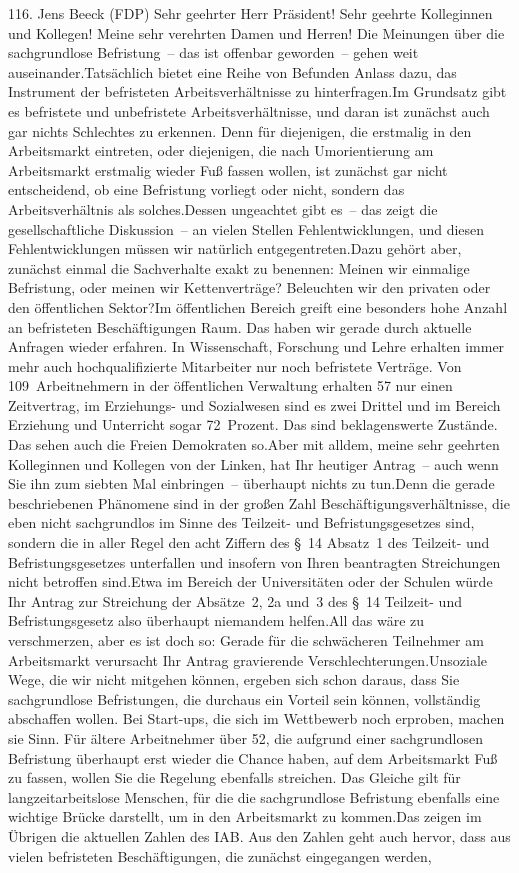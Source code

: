 \documentclass{article}
\begin{document}
	116. Jens Beeck (FDP) Sehr geehrter Herr Präsident! Sehr geehrte Kolleginnen und Kollegen! Meine sehr verehrten Damen und Herren! Die Meinungen über die sachgrundlose Befristung – das ist offenbar geworden – gehen weit auseinander.Tatsächlich bietet eine Reihe von Befunden Anlass dazu, das Instrument der befristeten Arbeitsverhältnisse zu hinterfragen.Im Grundsatz gibt es befristete und unbefristete Arbeitsverhältnisse, und daran ist zunächst auch gar nichts Schlechtes zu erkennen. Denn für diejenigen, die erstmalig in den Arbeitsmarkt eintreten, oder diejenigen, die nach Umorientierung am Arbeitsmarkt erstmalig wieder Fuß fassen wollen, ist zunächst gar nicht entscheidend, ob eine Befristung vorliegt oder nicht, sondern das Arbeitsverhältnis als solches.Dessen ungeachtet gibt es – das zeigt die gesellschaftliche Diskussion – an vielen Stellen Fehlentwicklungen, und diesen Fehlentwicklungen müssen wir natürlich entgegentreten.Dazu gehört aber, zunächst einmal die Sachverhalte exakt zu benennen: Meinen wir einmalige Befristung, oder meinen wir Kettenverträge? Beleuchten wir den privaten oder den öffentlichen Sektor?Im öffentlichen Bereich greift eine besonders hohe Anzahl an befristeten Beschäftigungen Raum. Das haben wir gerade durch aktuelle Anfragen wieder erfahren. In Wissenschaft, Forschung und Lehre erhalten immer mehr auch hochqualifizierte Mitarbeiter nur noch befristete Verträge. Von 109 Arbeitnehmern in der öffentlichen Verwaltung erhalten 57 nur einen Zeitvertrag, im Erziehungs- und Sozialwesen sind es zwei Drittel und im Bereich Erziehung und Unterricht sogar 72 Prozent. Das sind beklagenswerte Zustände. Das sehen auch die Freien Demokraten so.Aber mit alldem, meine sehr geehrten Kolleginnen und Kollegen von der Linken, hat Ihr heutiger Antrag – auch wenn Sie ihn zum siebten Mal einbringen – überhaupt nichts zu tun.Denn die gerade beschriebenen Phänomene sind in der großen Zahl Beschäftigungsverhältnisse, die eben nicht sachgrundlos im Sinne des Teilzeit- und Befristungsgesetzes sind, sondern die in aller Regel den acht Ziffern des § 14 Absatz 1 des Teilzeit- und Befristungsgesetzes unterfallen und insofern von Ihren beantragten Streichungen nicht betroffen sind.Etwa im Bereich der Universitäten oder der Schulen würde Ihr Antrag zur Streichung der Absätze 2, 2a und 3 des § 14 Teilzeit- und Befristungsgesetz also überhaupt niemandem helfen.All das wäre zu verschmerzen, aber es ist doch so: Gerade für die schwächeren Teilnehmer am Arbeitsmarkt verursacht Ihr Antrag gravierende Verschlechterungen.Unsoziale Wege, die wir nicht mitgehen können, ergeben sich schon daraus, dass Sie sachgrundlose Befristungen, die durchaus ein Vorteil sein können, vollständig abschaffen wollen. Bei Start-ups, die sich im Wettbewerb noch erproben, machen sie Sinn. Für ältere Arbeitnehmer über 52, die aufgrund einer sachgrundlosen Befristung überhaupt erst wieder die Chance haben, auf dem Arbeitsmarkt Fuß zu fassen, wollen Sie die Regelung ebenfalls streichen. Das Gleiche gilt für langzeitarbeitslose Menschen, für die die sachgrundlose Befristung ebenfalls eine wichtige Brücke darstellt, um in den Arbeitsmarkt zu kommen.Das zeigen im Übrigen die aktuellen Zahlen des IAB. Aus den Zahlen geht auch hervor, dass aus vielen befristeten Beschäftigungen, die zunächst eingegangen werden, 
\end{document}
